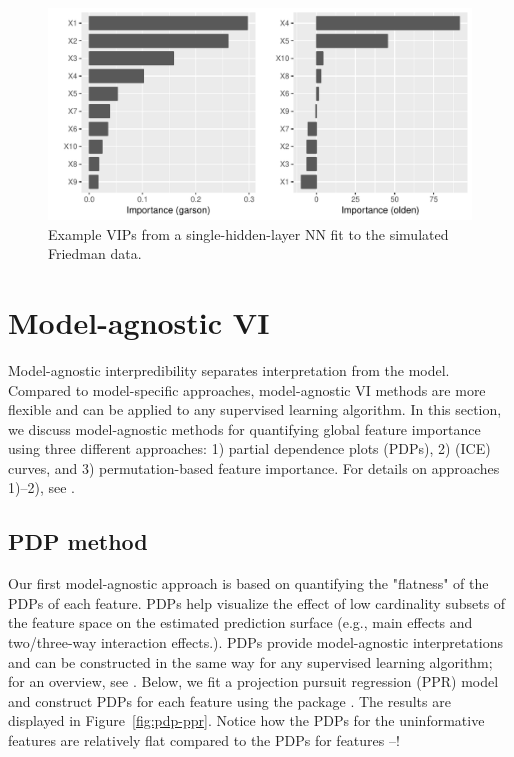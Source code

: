 \begin{figure}[!htb]
  \centering 
  \includegraphics[width=1\linewidth]{figures/vip-model-nn} 
  \caption{Example VIPs from a single-hidden-layer NN fit to the simulated Friedman data.}
  \label{fig:vip-earth}
\end{figure}


\section{Model-agnostic VI}

Model-agnostic interpredibility separates interpretation from the model. Compared to model-specific approaches, model-agnostic VI methods are more flexible and can be applied to any supervised learning algorithm. In this section, we discuss model-agnostic methods for quantifying global feature importance using three different approaches: 1) partial dependence plots (PDPs), 2)  (ICE) curves, and 3) permutation-based feature importance. For details on approaches 1)--2), see \citet{greenwell-simple-2018}.


\subsection{PDP method}

Our first model-agnostic approach is based on quantifying the "flatness" of the PDPs of each feature. PDPs help visualize the effect of low cardinality subsets of the feature space on the estimated prediction surface (e.g., main effects and two/three-way interaction effects.). PDPs provide model-agnostic interpretations and can be constructed in the same way for any supervised learning algorithm; for an overview, see \citet{greenwell-pdp-2017}. Below, we fit a projection pursuit regression (PPR) model and construct PDPs for each feature using the  package \citet{greenwell-pdp-2017}. The results are displayed in Figure~\ref{fig:pdp-ppr}. Notice how the PDPs for the uninformative features are relatively flat compared to the PDPs for features --!

